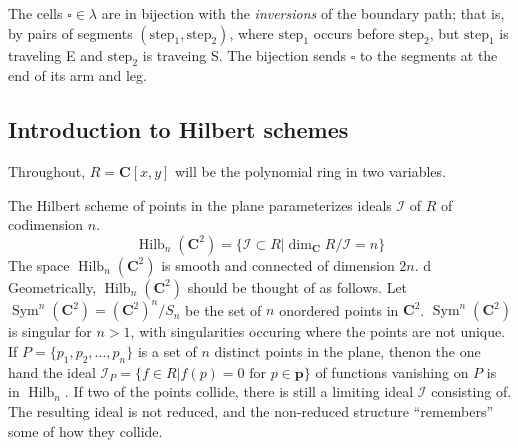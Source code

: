 \documentclass{amsart}[12pt]
\theoremstyle{definition}
\newcommand{\C}{\mathbf{C}}
\DeclareMathOperator{\Hilb}{Hilb}
\DeclareMathOperator{\Sym}{Sym}
\begin{document}
The cells $\square\in\lambda$ are in bijection with the
\emph{inversions} of the boundary path; that is, by pairs of segments
$(\text{step}_1, \text{step}_2)$, where $\text{step}_1$ occurs before $\text{step}_2$, but $\text{step}_1$ is traveling E and $\text{step}_2$ is traveing S.  The bijection sends $\square$ to the segments at the end of its arm and leg.





\subsection{Introduction to Hilbert schemes}

Throughout, $R=\C[x,y]$ will be the polynomial ring in two variables.  

The Hilbert scheme of points in the plane parameterizes ideals $\mathcal{I}$ of $R$ of codimension $n$.
$$\Hilb_n(\C^2)=\{\mathcal{I}\subset R | \dim_\C R/\mathcal{I}=n\}$$
The space $\Hilb_n(\C^2)$ is smooth and connected of dimension $2n$.
d
Geometrically, $\Hilb_n(\C^2)$ should be thought of as follows.  Let $\Sym^n(\C^2)=(\C^2)^n/S_n$ be the set of $n$ onordered points in $\C^2$.  $\Sym^n(\C^2)$ is singular for $n>1$, with singularities occuring where the points are not unique.  
If $P=\{p_1,p_2,\dots, p_n\}$ is a set of $n$ distinct points in the plane, thenon the one hand the ideal $\mathcal{I}_{P}=\{f\in R| f(p)=0 \text{ for }p\in \mathbf{p}\}$ of functions vanishing on $P$ is in $\Hilb_n$.  If two of the points collide, there is still a limiting ideal $\mathcal{I}$ consisting of.  The resulting ideal is not reduced, and the non-reduced structure ``remembers'' some of how they collide.
\end{document}
